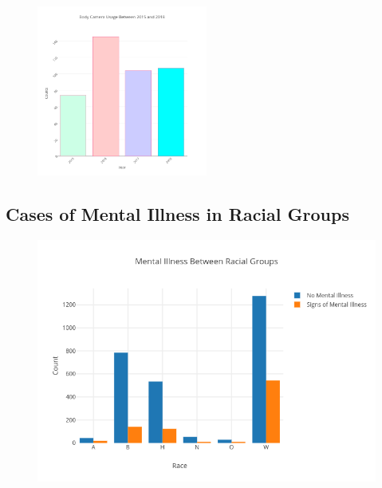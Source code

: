\documentclass[a4paper,12pt]{article}
\begin{document}
\begin{figure}[hbt!]
    \centering
    \includegraphics[width=0.5\textwidth]{body_camera.png}
    \caption{}
\end{figure}
\FloatBarrier

\subsection{Cases of Mental Illness in Racial Groups}
\begin{figure}[hbt!]
    \centering
    \includegraphics[width=1.0\textwidth]{mental_image_plot.png}
    \caption{}
\end{figure}
\FloatBarrier
\end{document}
